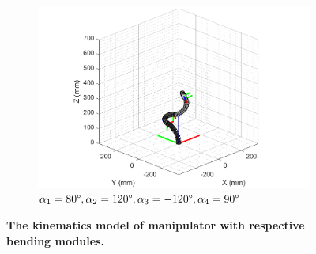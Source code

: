 \begin{figure}[H] %
    \centering %
    \captionsetup{labelsep=colon}
    \begin{subfigure}{0.85\textwidth} %
        \centering
        \includegraphics[width=\linewidth]{Image/MATLAB/manipulator_80_120_-120_90.png}
        \caption{\centering $\alpha_1=80\degree,\alpha_2=120 \degree,\alpha_3=-120\degree,\alpha_4=90\degree$}
    \end{subfigure}
    \caption[The kinematics model of manipulator with respective bending modules]
    {\centering \textbf{The kinematics model of manipulator with respective bending modules.}}
    \label{fig:different}
\end{figure}

